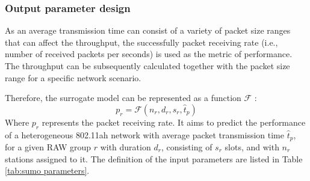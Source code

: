  \subsubsection{Output parameter design \label{subsec:output_para_design}}

 As an average transmission time can consist of a variety of packet size ranges that can affect the throughput, the successfully packet receiving rate (i.e., number of received packets per seconds) is used as the metric of performance. The throughput can be subsequently calculated
together with the packet size range for a specific network scenario.
 

 
 





Therefore, the surrogate model can be represented as a function  $\mathcal{F}$ :
\begin{equation} \label{eq:raw_model}
p_r = \mathcal{F}(n_r, d_r, s_r, \hat{t}_p) 
\end{equation}
Where $p_r$ represents the packet receiving rate. It aims to predict the performance of a heterogeneous 802.11ah network with average packet transmission time $\hat{t}_p$, for a given RAW group $r$ with duration $d_r$, consisting of $s_r$ slots, and with $n_r$ stations assigned to it. The definition of the input parameters are listed in Table \ref{tab:sumo parameters}.

